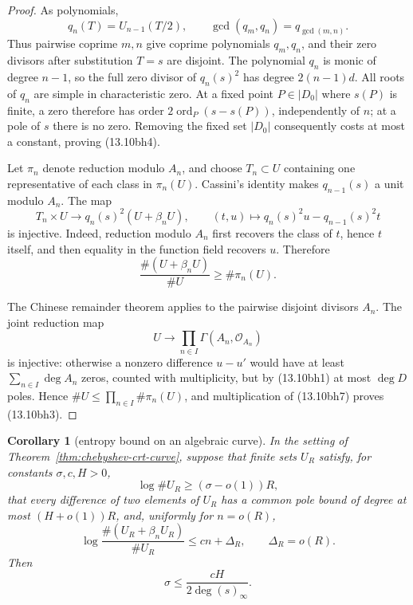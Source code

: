 \documentclass[11pt,reqno]{amsart}
\newtheorem{corollary}[theorem]{Corollary}
\theoremstyle{definition}
\theoremstyle{remark}
\begin{document}
\begin{proof}
As polynomials,
\[
 q_n(T)=U_{n-1}(T/2),\qquad
 \gcd(q_m,q_n)=q_{\gcd(m,n)}.
\tag{13.10bh5}
\]
Thus pairwise coprime \(m,n\) give coprime polynomials
\(q_m,q_n\), and their zero divisors after substitution \(T=s\) are
disjoint.  The polynomial \(q_n\) is monic of degree \(n-1\), so the full
zero divisor of \(q_n(s)^2\) has degree \(2(n-1)d\).
All roots of \(q_n\) are simple in characteristic zero.  At a fixed
point \(P\in|D_0|\) where \(s(P)\) is finite, a zero therefore has order
\(2\operatorname{ord}_P(s-s(P))\), independently of \(n\); at a pole of
\(s\) there is no zero.  Removing the fixed set \(|D_0|\) consequently
costs at most a constant, proving (13.10bh4).

Let \(\pi_n\) denote reduction modulo \(A_n\), and choose
\(T_n\subset U\) containing one representative of each class in
\(\pi_n(U)\).  Cassini's identity makes \(q_{n-1}(s)\) a unit modulo
\(A_n\).  The map
\[
 T_n\times U\longrightarrow q_n(s)^2(U+\beta_nU),\qquad
 (t,u)\longmapsto q_n(s)^2u-q_{n-1}(s)^2t
\tag{13.10bh6}
\]
is injective.  Indeed, reduction modulo \(A_n\) first recovers the class
of \(t\), hence \(t\) itself, and then equality in the function field
recovers \(u\).  Therefore
\[
 \frac{\#(U+\beta_nU)}{\#U}\ge\#\pi_n(U).
\tag{13.10bh7}
\]

The Chinese remainder theorem applies to the pairwise disjoint divisors
\(A_n\).  The joint reduction map
\[
 U\longrightarrow\prod_{n\in I}
 \Gamma(A_n,\mathcal O_{A_n})
\]
is injective: otherwise a nonzero difference \(u-u'\) would have at
least \(\sum_{n\in I}\deg A_n\) zeros, counted with multiplicity, but by
(13.10bh1) at most \(\deg D\) poles.  Hence
\(\#U\le\prod_{n\in I}\#\pi_n(U)\), and multiplication of (13.10bh7)
proves (13.10bh3).
\end{proof}

\begin{corollary}[entropy bound on an algebraic curve]
\label{cor:chebyshev-crt-entropy}
In the setting of Theorem~\ref{thm:chebyshev-crt-curve}, suppose that
finite sets \(U_R\) satisfy, for constants \(\sigma,c,H>0\),
\[
 \log\#U_R\ge(\sigma-o(1))R,
\tag{13.10bh8}
\]
that every difference of two elements of \(U_R\) has a common pole bound
of degree at most \((H+o(1))R\), and, uniformly for \(n=o(R)\),
\[
 \log\frac{\#(U_R+\beta_nU_R)}{\#U_R}
 \le cn+\Delta_R,\qquad \Delta_R=o(R).
\tag{13.10bh9}
\]
Then
\[
 \sigma\le\frac{cH}{2\deg(s)_\infty}.
\tag{13.10bh10}
\]
\end{corollary}
\end{document}
